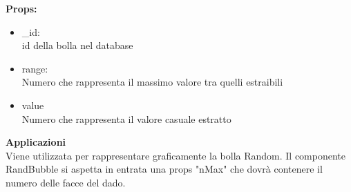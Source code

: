 \textbf{Props:} 
\begin{itemize}
\item \_id: 
\\
id della bolla nel database
\item range: 
\\
Numero che rappresenta il massimo valore tra quelli estraibili
\item value
\\
Numero che rappresenta il valore casuale estratto

\end{itemize} 


\textbf{Applicazioni}\\
Viene utilizzata per rappresentare graficamente la bolla Random.
Il componente RandBubble si aspetta in entrata una props "nMax" che dovrà contenere il numero delle facce del dado. 


\clearpage

